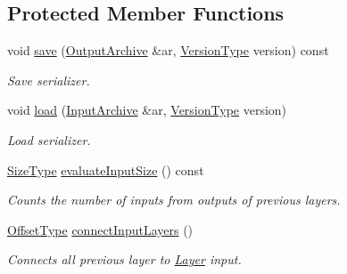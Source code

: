 \subsection*{Protected Member Functions}
\begin{DoxyCompactItemize}
\item 
void \hyperlink{classffnn_1_1layer_1_1_layer_ac265fc929a178b111337226dd1cb62b6}{save} (\hyperlink{classffnn_1_1traits_1_1_serializable_a08d986df75d363fa79506d4f6045cb9f}{Output\-Archive} \&ar, \hyperlink{classffnn_1_1traits_1_1_serializable_a08924b3b7d20cb3cb6eafe517d4f7b30}{Version\-Type} version) const 
\begin{DoxyCompactList}\small\item\em Save serializer. \end{DoxyCompactList}\item 
void \hyperlink{classffnn_1_1layer_1_1_layer_a23f5f3c958d888632010327471c7b012}{load} (\hyperlink{classffnn_1_1traits_1_1_serializable_a6e626759259f8f370dd4303b4441a234}{Input\-Archive} \&ar, \hyperlink{classffnn_1_1traits_1_1_serializable_a08924b3b7d20cb3cb6eafe517d4f7b30}{Version\-Type} version)
\begin{DoxyCompactList}\small\item\em Load serializer. \end{DoxyCompactList}\item 
\hyperlink{classffnn_1_1layer_1_1internal_1_1_interface_af0567642f60c65b5e87067226a54174b}{Size\-Type} \hyperlink{classffnn_1_1layer_1_1_layer_afdc489e04b2b1e716940f598ac474e4c}{evaluate\-Input\-Size} () const 
\begin{DoxyCompactList}\small\item\em Counts the number of inputs from outputs of previous layers. \end{DoxyCompactList}\item 
\hyperlink{classffnn_1_1layer_1_1internal_1_1_interface_adc5bb454329ebd51ac26579a43c006fd}{Offset\-Type} \hyperlink{classffnn_1_1layer_1_1_layer_a9d692bce889ddc693e5bac8dda5d4cd2}{connect\-Input\-Layers} ()
\begin{DoxyCompactList}\small\item\em Connects all previous layer to \hyperlink{classffnn_1_1layer_1_1_layer}{Layer} input. \end{DoxyCompactList}\end{DoxyCompactItemize}
